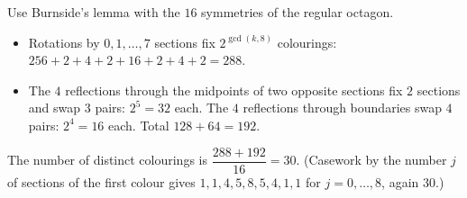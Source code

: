 Use Burnside's lemma with the $16$ symmetries of the regular octagon.
\begin{itemize}
\item Rotations by $0,1,\dots,7$ sections fix $2^{\gcd(k,8)}$ colourings: $256+2+4+2+16+2+4+2=288$.
\item The $4$ reflections through the midpoints of two opposite sections fix $2$ sections and swap $3$ pairs: $2^5=32$ each. The $4$ reflections through boundaries swap $4$ pairs: $2^4=16$ each. Total $128+64=192$.
\end{itemize}
The number of distinct colourings is $\dfrac{288+192}{16}=\boxed{30}$. (Casework by the number $j$ of sections of the first colour gives $1,1,4,5,8,5,4,1,1$ for $j=0,\dots,8$, again $30$.)
